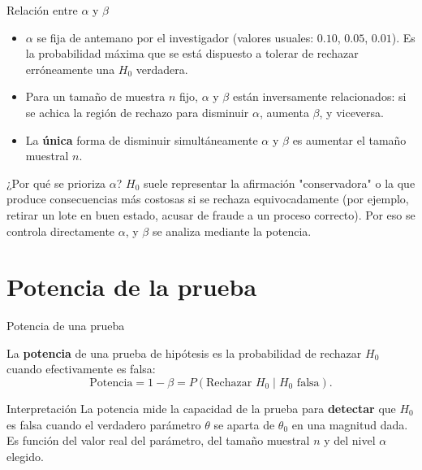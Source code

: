 \documentclass[aspectratio=169,11pt]{beamer}
\begin{document}
\begin{frame}{Relación entre $\alpha$ y $\beta$}
\begin{itemize}
\item $\alpha$ se fija de antemano por el investigador (valores usuales: $0.10$, $0.05$, $0.01$). Es la probabilidad máxima que se está dispuesto a tolerar de rechazar erróneamente una $H_0$ verdadera.
\item Para un tamaño de muestra $n$ fijo, $\alpha$ y $\beta$ están inversamente relacionados: si se achica la región de rechazo para disminuir $\alpha$, aumenta $\beta$, y viceversa.
\item La \textbf{única} forma de disminuir simultáneamente $\alpha$ y $\beta$ es aumentar el tamaño muestral $n$.
\end{itemize}

\begin{alertblock}{¿Por qué se prioriza $\alpha$?}
$H_0$ suele representar la afirmación "conservadora" o la que produce consecuencias más costosas si se rechaza equivocadamente (por ejemplo, retirar un lote en buen estado, acusar de fraude a un proceso correcto). Por eso se controla directamente $\alpha$, y $\beta$ se analiza mediante la potencia.
\end{alertblock}
\end{frame}

\section{Potencia de la prueba}

\begin{frame}{Potencia de una prueba}
\begin{definition}
La \textbf{potencia} de una prueba de hipótesis es la probabilidad de rechazar $H_0$ cuando efectivamente es falsa:
\[
\text{Potencia} = 1-\beta = P(\text{Rechazar } H_0 \mid H_0 \text{ falsa}).
\]
\end{definition}

\begin{block}{Interpretación}
La potencia mide la capacidad de la prueba para \textbf{detectar} que $H_0$ es falsa cuando el verdadero parámetro $\theta$ se aparta de $\theta_0$ en una magnitud dada. Es función del valor real del parámetro, del tamaño muestral $n$ y del nivel $\alpha$ elegido.
\end{block}

\end{frame}
\end{document}
